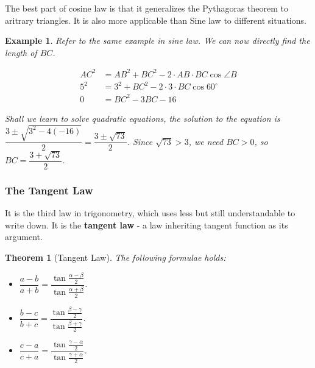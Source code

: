 \documentclass[12pt]{article}
\newtheorem*{theorem}{Theorem}
\newtheorem*{example}{Example}
\begin{document}
    The best part of cosine law is that it generalizes the Pythagoras theorem to aritrary triangles. It is also more applicable than Sine law to different situations.

    \begin{example}
        Refer to the same example in sine law. We can now directly find the length of $BC$.

        \begin{align*}
            AC^2 &= AB^2 + BC^2 - 2\cdot AB\cdot BC\cos{\angle B}\\
            5^2 &= 3^2 + BC^2 - 2\cdot 3\cdot BC\cos{60^\circ}\\
            0 &= BC^2 - 3BC - 16
        \end{align*}

        Shall we learn to solve quadratic equations, the solution to the equation is $\dfrac{3\pm \sqrt{3^2-4(-16)}}{2}=\dfrac{3\pm \sqrt{73}}{2}$. Since $\sqrt{73}>3$, we need $BC>0$, so $BC=\dfrac{3+\sqrt{73}}{2}$.
    \end{example}

    \subsubsection*{The Tangent Law}

    It is the third law in trigonometry, which uses less but still understandable to write down. It is the \textbf{tangent law} - a law inheriting tangent function as its argument.

    \begin{theorem}[Tangent Law]
        The following formulae holds:\begin{itemize}
            \item $\dfrac{a-b}{a+b}=\dfrac{\tan{\frac{\alpha-\beta}{2}}}{\tan{\frac{\alpha+\beta}{2}}}$.
            \item $\dfrac{b-c}{b+c}=\dfrac{\tan{\frac{\beta-\gamma}{2}}}{\tan{\frac{\beta+\gamma}{2}}}$.
            \item $\dfrac{c-a}{c+a}=\dfrac{\tan{\frac{\gamma-\alpha}{2}}}{\tan{\frac{\gamma+\alpha}{2}}}$.
        \end{itemize}
    \end{theorem}
\end{document}
